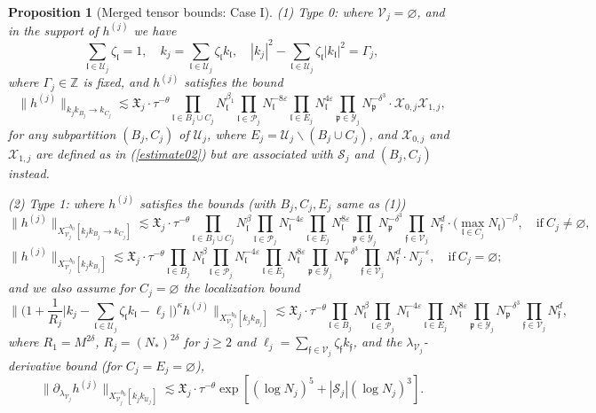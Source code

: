 \documentclass[11 pt,reqno]{amsart}
\newtheorem{prop}[thm]{Proposition}
\theoremstyle{definition}
\theoremstyle{remark}
\numberwithin{equation}{section}
\newcommand{\Sc}{\mathcal{S}}
\newcommand{\Pc}{\mathcal{P}}
\newcommand{\Uc}{\mathcal{U}}
\newcommand{\Vc}{\mathcal{V}}
\newcommand{\Xc}{\mathcal{X}}
\newcommand{\Yc}{\mathcal{Y}}
\newcommand{\Zb}{\mathbb{Z}}
\newcommand{\pf}{\mathfrak{p}}
\newcommand{\ff}{\mathfrak{f}}
\newcommand{\Xf}{\mathfrak{X}}
\newcommand{\lf}{\mathfrak{l}}
\begin{document}
{\begin{prop}[Merged tensor bounds: Case I]
(1) Type 0: where $\Vc_j=\varnothing$, and in the support of $h^{(j)}$ we have
\begin{equation}\label{supportmerge}\sum_{\lf\in\Uc_j}\zeta_\lf=1,\quad k_j=\sum_{\lf\in\Uc_j}\zeta_\lf k_\lf,\quad |k_j|^2-\sum_{\lf\in\Uc_j}\zeta_\lf|k_\lf|^2=\Gamma_j,
\end{equation} where $\Gamma_j\in\Zb$ is fixed, and $h^{(j)}$ satisfies the bound
\begin{equation}\label{boundmerge1}\|h^{(j)}\|_{k_jk_{B_j}\to k_{C_j}}\lesssim\Xf_j\cdot\tau^{-\theta}\prod_{\lf\in B_j\cup C_j} N_\lf^{\beta_1}\prod_{\lf\in\Pc_j}N_\lf^{-8\varepsilon}\prod_{\lf\in E_j}N_\lf^{4\varepsilon}\prod_{\pf\in\Yc_j}N_\pf^{-\delta^3}\cdot\Xc_{0,j}\Xc_{1,j},
\end{equation} for any subpartition $(B_j,C_j)$ of $\Uc_j$, where $E_j=\Uc_j\backslash(B_j\cup C_j)$, and $\Xc_{0,j}$ and $\Xc_{1,j}$ are defined as in (\ref{estimate02}) but are associated with $\Sc_j$ and $(B_j,C_j)$ instead.

(2) Type 1: where $h^{(j)}$ satisfies the bounds (with $B_j,C_j,E_j$ same as (1)) \begin{equation}\label{boundmerge2}\|h^{(j)}\|_{X_{\Vc_j}^{-b_0}[k_jk_{B_j}\to k_{C_j}]}\lesssim\Xf_j\cdot\tau^{-\theta}\prod_{\lf\in B_j\cup C_j}N_\lf^\beta\prod_{\lf\in\Pc_j}N_\lf^{-4\varepsilon}\prod_{\lf\in E_j}N_\lf^{8\varepsilon}\prod_{\pf\in\Yc_j}N_\pf^{-\delta^3} \prod_{\ff \in \Vc_j} N_\ff^d\cdot \big(\max_{\lf\in C_j}N_\lf\big)^{-\beta},\quad \mathrm{if\ }C_j\neq\varnothing,
 \end{equation} 
 \begin{equation}
 \label{boundmerge3}\|h^{(j)}\|_{X_{\Vc_j}^{-b_0}[k_jk_{B_j}]}\lesssim\Xf_j\cdot\tau^{-\theta}\prod_{\lf\in B_j}N_\lf^\beta\prod_{\lf\in\Pc_j}N_\lf^{-4\varepsilon}\prod_{\lf\in E_j}N_\lf^{8\varepsilon}\prod_{\pf\in\Yc_j}N_\pf^{-\delta^3}\prod_{\ff \in \Vc_j} N_\ff^d\cdot N_j^{-\varepsilon},\quad\mathrm{if\ }C_j=\varnothing;
 \end{equation} and we also assume for $C_j=\varnothing$ the localization bound
 \begin{equation} \label{boundmerge5}\bigg\|\bigg(1+\frac{1}{R_j}\big|k_j-\sum_{\lf\in\Uc_j}\zeta_\lf k_\lf-\ell_j\big|\bigg)^\kappa h^{(j)}\bigg\|_{X^{-b_0}_{\Vc_j}[k_jk_{B_j}]}\lesssim\Xf_j\cdot \tau^{-\theta}\prod_{\lf\in B_j}N_\lf^\beta\prod_{\lf\in\Pc_j}N_\lf^{-4\varepsilon}\prod_{\lf\in E_j}N_\lf^{8\varepsilon}\prod_{\pf\in\Yc_j}N_\pf^{-\delta^3}\prod_{\ff \in \Vc_j} N_\ff^d,
 \end{equation} where $R_1=M^{2\delta}$, $R_j=(N_*)^{2\delta}$ for $j\geq 2$ and $\ell_j=\sum_{\ff\in\Vc_j}\zeta_\ff k_\ff$, and the $\lambda_{\Vc_j}$-derivative bound (for $C_j=E_j=\varnothing$),
  \begin{equation} \label{boundmerge6}\|\partial_{\lambda_{\Vc_j}}h^{(j)}\|_{X_{\Vc_j}^{-b_0}[k_jk_{\Uc_j}]}\lesssim \Xf_j\cdot\tau^{-\theta}\exp[(\log N_j)^5+|\Sc_j|(\log N_j)^3].
 \end{equation}


\end{prop}}
\end{document}
